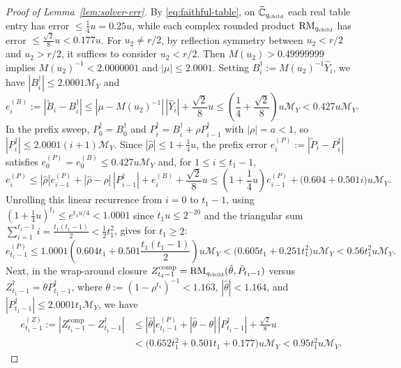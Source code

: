 \begin{proof}[Proof of Lemma~\ref{lem:solver-err}]
By \eqref{eq:faithful-table}, on $\widetilde{\mathbb{C}}_{q_{\mathrm{child}}}$ each real table entry has error $\le \frac{1}{4} u = 0.25 u$, while each complex rounded product $\operatorname{RM}_{q_{\mathrm{child}}}$ has error $\le \frac{\sqrt{2}}{8} u < 0.177 u$.
For $u_2 \ne r/2$, by reflection symmetry between $u_2 < r/2$ and $u_2 > r/2$, it suffices to consider $u_2 < r/2$. Then $M(u_2) > 0.49999999$ implies $M(u_2)^{-1} < 2.0000001$ and $|\mu| \le 2.0001$. Setting $B^\dagger_i := M(u_2)^{-1} \widehat{Y}_i$, we have $|B^\dagger_i| \le 2.0001 \mathcal{M}_Y$ and
\[
  e_i^{(B)} := |\tilde{B}_i - B^\dagger_i| \le |\mu - M(u_2)^{-1}| \, |\widehat{Y}_i| + \frac{\sqrt{2}}{8} u \le \left(\frac{1}{4} + \frac{\sqrt{2}}{8}\right) u \mathcal{M}_Y < 0.427 u \mathcal{M}_Y.
\]
In the prefix sweep, $P^\dagger_0 = B^\dagger_0$ and $P^\dagger_i = B^\dagger_i + \rho P^\dagger_{i-1}$ with $|\rho| = a < 1$, so $|P^\dagger_i| \le 2.0001(i + 1)\mathcal{M}_Y$. Since $|\hat{\rho}| \le 1 + \frac{1}{4}u$, the prefix error $e_i^{(P)} := |\tilde{P}_i - P^\dagger_i|$ satisfies $e_0^{(P)} = e_0^{(B)} \le 0.427 u \mathcal{M}_Y$ and, for $1 \le i \le t_1 - 1$,
\[
  e_i^{(P)} \le |\hat{\rho}| e_{i-1}^{(P)} + |\hat{\rho} - \rho|\,|P^\dagger_{i-1}| + e_i^{(B)} + \frac{\sqrt{2}}{8} u \le \left(1 + \frac{1}{4}u\right) e_{i-1}^{(P)} + \bigl(0.604 + 0.501 i\bigr) u \mathcal{M}_Y.
\]
Unrolling this linear recurrence from $i = 0$ to $t_1 - 1$, using $(1 + \frac{1}{4}u)^{t_1} \le e^{t_1 u / 4} < 1.0001$ since $t_1 u \le 2^{-20}$ and the triangular sum $\sum_{i=1}^{t_1-1} i = \frac{t_1(t_1-1)}{2} < \frac{1}{2} t_1^2$, gives for $t_1 \ge 2$:
\[
  e_{t_1-1}^{(P)} \le 1.0001\left(0.604 t_1 + 0.501 \frac{t_1(t_1-1)}{2}\right) u \mathcal{M}_Y < \bigl(0.605 t_1 + 0.251 t_1^2\bigr) u \mathcal{M}_Y < 0.56 t_1^2 u \mathcal{M}_Y.
\]
Next, in the wrap-around closure $Z^{\mathrm{comp}}_{t_1-1} = \operatorname{RM}_{q_{\mathrm{child}}}(\hat{\theta}, \tilde{P}_{t_1-1})$ versus $Z^\dagger_{t_1-1} = \theta P^\dagger_{t_1-1}$, where $\theta := (1 - \rho^{t_1})^{-1} < 1.163$, $|\hat{\theta}| < 1.164$, and $|P^\dagger_{t_1-1}| \le 2.0001 t_1 \mathcal{M}_Y$, we have
\[
  \begin{aligned}
    e_{t_1-1}^{(Z)} := |Z^{\mathrm{comp}}_{t_1-1} - Z^\dagger_{t_1-1}|
    &\le |\hat{\theta}| e_{t_1-1}^{(P)} + |\hat{\theta} - \theta|\,|P^\dagger_{t_1-1}| + \frac{\sqrt{2}}{8} u \\
    &< \bigl(0.652 t_1^2 + 0.501 t_1 + 0.177\bigr) u \mathcal{M}_Y < 0.95 t_1^2 u \mathcal{M}_Y.
  \end{aligned}
\]
\end{proof}

